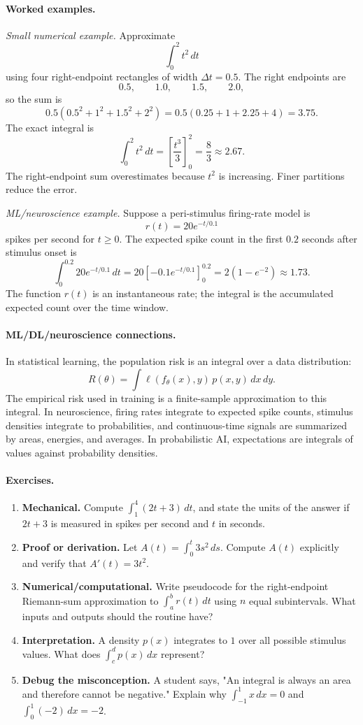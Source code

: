 \paragraph{Worked examples.}
\emph{Small numerical example.} Approximate
\[
\int_0^2 t^2\,dt
\]
using four right-endpoint rectangles of width \(\Delta t=0.5\). The right endpoints are
\[
0.5,\qquad 1.0,\qquad 1.5,\qquad 2.0,
\]
so the sum is
\[
0.5\left(0.5^2+1^2+1.5^2+2^2\right)
=0.5(0.25+1+2.25+4)
=3.75.
\]
The exact integral is
\[
\int_0^2t^2\,dt=\left[\frac{t^3}{3}\right]_0^2=\frac{8}{3}\approx 2.67.
\]
The right-endpoint sum overestimates because \(t^2\) is increasing. Finer partitions reduce the error.

\emph{ML/neuroscience example.} Suppose a peri-stimulus firing-rate model is
\[
r(t)=20e^{-t/0.1}
\]
spikes per second for \(t\geq 0\). The expected spike count in the first \(0.2\) seconds after stimulus onset is
\[
\int_0^{0.2}20e^{-t/0.1}\,dt
=20\left[-0.1e^{-t/0.1}\right]_0^{0.2}
=2(1-e^{-2})
\approx 1.73.
\]
The function \(r(t)\) is an instantaneous rate; the integral is the accumulated expected count over the time window.

\paragraph{ML/DL/neuroscience connections.}
In statistical learning, the population risk is an integral over a data distribution:
\[
R(\theta)=\int \ell(f_\theta(x),y)\,p(x,y)\,dx\,dy.
\]
The empirical risk used in training is a finite-sample approximation to this integral. In neuroscience, firing rates integrate to expected spike counts, stimulus densities integrate to probabilities, and continuous-time signals are summarized by areas, energies, and averages. In probabilistic AI, expectations are integrals of values against probability densities.

\paragraph{Exercises.}
\begin{enumerate}[label=\textbf{8.3.\arabic*.}, leftmargin=*]
\item \textbf{Mechanical.} Compute \(\int_1^4(2t+3)\,dt\), and state the units of the answer if \(2t+3\) is measured in spikes per second and \(t\) in seconds.
\item \textbf{Proof or derivation.} Let \(A(t)=\int_0^t 3s^2\,ds\). Compute \(A(t)\) explicitly and verify that \(A'(t)=3t^2\).
\item \textbf{Numerical/computational.} Write pseudocode for the right-endpoint Riemann-sum approximation to \(\int_a^b r(t)\,dt\) using \(n\) equal subintervals. What inputs and outputs should the routine have?
\item \textbf{Interpretation.} A density \(p(x)\) integrates to \(1\) over all possible stimulus values. What does \(\int_c^d p(x)\,dx\) represent?
\item \textbf{Debug the misconception.} A student says, "An integral is always an area and therefore cannot be negative." Explain why \(\int_{-1}^1 x\,dx=0\) and \(\int_0^1(-2)\,dx=-2\).
\end{enumerate}

